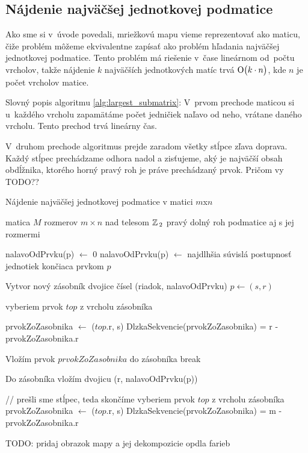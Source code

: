 \subsection{Nájdenie najväčšej jednotkovej podmatice}
Ako sme si v~úvode povedali, mriežkovú mapu vieme reprezentovať ako maticu, čiže
problém môžeme ekvivalentne zapísať ako problém hľadania najväčšej jednotkovej podmatice.
Tento problém má riešenie v~čase lineárnom od~počtu vrcholov, takže nájdenie $k$ najväčších
jednotkových matíc trvá $\operatorname{O}\bigl(k \cdot n\bigr)$, kde $n$ je počet vrcholov matice.

Slovný popis algoritmu \ref{alg:largest_submatrix}: 
V~prvom prechode maticou si u~každého vrcholu zapamätáme počet jedničiek naľavo od neho, vrátane daného vrcholu. 
Tento prechod trvá lineárny čas.

V~druhom prechode algoritmus prejde zaradom všetky stĺpce zľava doprava.
Každý stĺpec prechádzame odhora nadol a zisťujeme, aký je najväčší obsah obdĺžnika, ktorého horný pravý roh je práve prechádzaný prvok.
Pričom vy TODO??


\begin{algorithm}
\caption{Nájdenie najväčšej jednotkovej podmatice v matici  $m$x$n$}
\label{alg:largest_submatrix}
\begin{algorithmic}[1] %
\REQUIRE matica $M$ rozmerov $m \times n$ nad telesom $\mathbb{Z}\,_2$
\ENSURE pravý dolný roh podmatice aj s jej rozmermi


		\STATE nalavoOdPrvku(p) $\leftarrow$ 0
	\ELSE
		\STATE nalavoOdPrvku(p) $\leftarrow$ najdlhšia súvislá postupnosť jednotiek končiaca prvkom $p$
	\ENDIF	
\ENDFOR

	\STATE Vytvor nový zásobník dvojice čísel (riadok, nalavoOdPrvku)
		\STATE $p \leftarrow (s, r)$
		
			\STATE vyberiem prvok $top$ z vrcholu zásobníka
						
				\STATE prvokZoZasobnika $\leftarrow$ ($top$.r, s)
				\STATE DlzkaSekvencie(prvokZoZasobnika) = r - prvokZoZasobnika.r
			
			\ELSE
				\STATE Vložím prvok $prvokZoZasobnika$ do zásobníka
				\STATE break
			\ENDIF
		\ENDWHILE
		
		\STATE Do zásobníka vložím dvojicu (r, nalavoOdPrvku(p))
	\ENDFOR
	
	\STATE // prešli sme stĺpec, teda skončíme
		\STATE vyberiem prvok $top$ z vrcholu zásobníka
		\STATE prvokZoZasobnika $\leftarrow$ ($top$.r, s)
		\STATE DlzkaSekvencie(prvokZoZasobnika) = m - prvokZoZasobnika.r
		
	\ENDWHILE
\ENDFOR




\end{algorithmic}
\end{algorithm}



TODO: pridaj obrazok mapy a jej dekompozicie opdla farieb